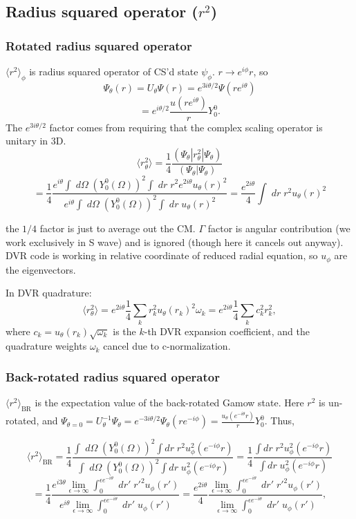 \subsection{Radius squared operator ($r^2$)}
\subsubsection{Rotated radius squared operator}
$\langle r^2\rangle_\phi$ is radius squared operator of CS'd state $\psi_\phi$. $r\rightarrow e^{i\phi} r$, so
$$
\Psi_\theta(r) = U_\theta \Psi(r) = e^{3i\theta/2}\Psi(re^{i\theta})
$$
$$
= e^{i\theta/2}\frac{u(re^{i\theta})}{r}Y^0_0.
$$
The $e^{3i\theta/2}$ factor comes from requiring that the complex scaling operator is unitary in 3D.
$$
\langle r^2_\theta \rangle =\frac{1}{4}\frac{(\Psi_\theta|r^2_\theta|\Psi_\theta)}{(\Psi_\theta|\Psi_\theta)}
$$
$$
=\frac{1}{4}\frac{e^{i\theta}\int \;d\Omega\; (Y_0^0(\Omega))^2 \int\; dr \; r^2e^{2i\theta} u_\theta(r)^2}{e^{i\theta}\int \;d\Omega\; (Y^0_0(\Omega))^2\int\;dr \; u_\theta(r)^2} = \frac{e^{2i\theta}}{4} \int\;dr\; r^2 u_\theta(r)^2
$$

the $1/4$ factor is just to average out the CM. $\Gamma$ factor is angular contribution (we work exclusively in S wave) and is ignored (though here it cancels out anyway). DVR code is working in relative coordinate of reduced radial equation, so $u_\phi$ are the eigenvectors.

In DVR quadrature:
$$
\langle r^2_\theta\rangle = e^{2i\theta}\frac{1}{4}\sum_k r_k^2 u_\theta(r_k)^2 \omega_k = e^{2i\theta} \frac{1}{4} \sum_k c_k^2 r_k^2,
$$
where $c_k=u_\theta(r_k)\sqrt{\omega_k}$ is the $k$-th DVR expansion coefficient, and the quadrature weights $\omega_k$ cancel due to c-normalization.

\subsubsection{Back-rotated radius squared operator}
$\langle r^2 \rangle_{\text{BR}}$ is the expectation value of the back-rotated Gamow state. Here $r^2$ is un-rotated, and $\Psi_{\theta=0}=U_\theta^{-1}\Psi_{\theta}=e^{-3i\theta/2}\Psi_{\theta}(re^{-i\phi}) =\frac{u_\theta(e^{-i\theta} r)}{r}Y^0_0$. Thus,

$$
\langle r^2 \rangle_{\text{BR}} = \frac{1}{4}\frac{\int \;d\Omega\;(Y_0^0(\Omega))^2\int dr\;r^2 u_\phi^2 (e^{-i\phi}r)}{\int\;d\Omega\;(Y_0^0(\Omega))^2\int dr\;u_\phi^2 (e^{-i\phi}r)} = \frac{1}{4} \frac{\int dr\;r^2 u_\phi^2 (e^{-i\phi}r)}{\int dr\;u_\phi^2 (e^{-i\phi}r)}
$$
$$
=\frac{1}{4}\frac{e^{i3\theta}\lim_{\epsilon\rightarrow \infty}\int_0^{\epsilon e^{-i\theta}}\;dr'\;r'^2 u_\phi(r')}{e^{i\theta}\lim_{\epsilon\rightarrow \infty}\int_0^{\epsilon e^{-i\theta}}\;dr'\;u_\phi(r')}= \frac{e^{2i\theta}}{4}\frac{\lim_{\epsilon\rightarrow \infty}\int_0^{\epsilon e^{-i\theta}}\;dr'\;r'^2 u_\phi(r')}{\lim_{\epsilon\rightarrow \infty}\int_0^{\epsilon e^{-i\theta}}\;dr'\;u_\phi(r')},
$$

